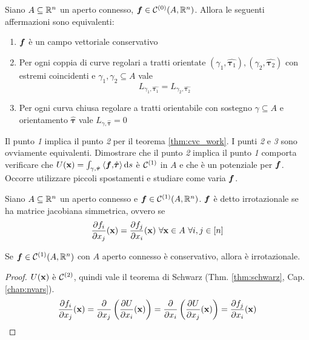 \begin{theorem}
	Siano $A\subseteq\mathbb{R}^n$ un aperto connesso, $\bm f \in \mathcal{C}^{(0)}(A,\mathbb{R}^n)$. Allora le seguenti affermazioni sono equivalenti:
	\begin{enumerate}
		\item $\bm f$ è un campo vettoriale conservativo
		\item Per ogni coppia di curve regolari a tratti orientate $(\gamma_1,\hat{\bm\tau_1}), (\gamma_2,\hat{\bm\tau_2})$ con estremi coincidenti e $\gamma_1,\gamma_2 \subseteq A$ vale
		$$
			L_{\gamma_1,\hat{\bm\tau_1}}=L_{\gamma_2,\hat{\bm\tau_2}}
		$$
		\item Per ogni curva chiusa regolare a tratti orientabile con sostegno $\gamma \subseteq A$ e orientamento $\hat{\bm\tau}$ vale $L_{\gamma, \hat{\bm\tau}}=0$
	\end{enumerate}
\end{theorem}

\begin{remark}
	Il punto \textit{1} implica il punto \textit{2} per il teorema \ref{thm:cvc_work}. I punti \textit{2} e \textit{3} sono ovviamente equivalenti. Dimostrare che il punto \textit{2} implica il punto \textit{1} comporta verificare che $U(\vb{x})=\int_{\gamma,\hat{\bm\tau}}\left\langle\bm f{,}\hat{\bm\tau}\right\rangle\dd s$ è $\mathcal{C}^{(1)}$ in $A$ e che è un potenziale per $\bm f$. Occorre utilizzare piccoli spostamenti e studiare come varia $\bm f$.
\end{remark}

\begin{definition}
	Siano $A\subseteq\mathbb{R}^n$ un aperto connesso e $\bm f \in \mathcal{C}^{(1)}(A,\mathbb{R}^n)$. $\bm f$ è detto irrotazionale se ha matrice jacobiana simmetrica, ovvero se
	$$
		\frac{\partial f_i}{\partial x_j}(\vb{x})=\frac{\partial f_j}{\partial x_i}(\vb{x}) \ \forall \vb{x} \in A \ \forall i,j \in [n]
	$$
\end{definition}

\begin{theorem}
	Se $\bm f \in \mathcal{C}^{(1)}(A,\mathbb{R}^n)$ con $A$ aperto connesso è conservativo, allora è irrotazionale.
\end{theorem}

\begin{proof}
	$U(\vb{x})$ è $\mathcal{C}^{(2)}$, quindi vale il teorema di Schwarz (Thm. \ref{thm:schwarz}, Cap. \ref{chap:nvars}).
	$$
		\frac{\partial f_i}{\partial x_j}(\vb{x})
		=\frac{\partial}{\partial x_j}\left(\frac{\partial U}{\partial x_i}(\vb{x})\right)=\frac{\partial}{\partial x_i}\left(\frac{\partial U}{\partial x_j}(\vb{x})\right)
		=\frac{\partial f_j}{\partial x_i}(\vb{x})
	$$
\end{proof}


